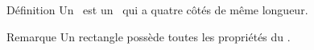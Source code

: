 \documentclass{beamer}
\begin{document}
\begin{frame}
	\frametitle{}  
	\framesubtitle{}
	
	\begin{columns}[onlytextwidth]	
		\begin{column}{0.65\textwidth}
			\begin{exampleblock}{Définition}
				Un \los\ est un \myquad\ qui a quatre côtés de même longueur.
			\end{exampleblock}
			
			\begin{block}{Remarque}
				Un rectangle possède toutes les propriétés du \para .
			\end{block}
			
		\end{column}
		\begin{column}{0.35\textwidth}
		\end{column}	
	\end{columns}
\end{frame}
\end{document}
